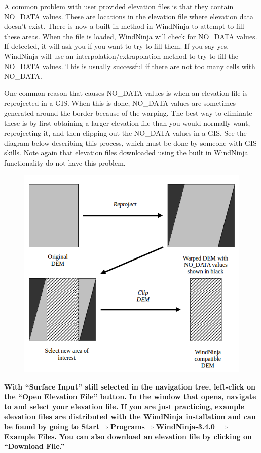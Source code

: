 \documentclass[12pt]{article}
\newcommand\vn{3.4.0}
\begin{document}
A common problem with user provided elevation files is that they contain NO\_DATA values.  These are locations in the elevation file where elevation data doesn’t exist.  There is now a built-in method in WindNinja to attempt to fill these areas.  When the file is loaded, WindNinja will check for NO\_DATA values.  If detected, it will ask you if you want to try to fill them.  If you say yes, WindNinja will use an interpolation/extrapolation method to try to fill the NO\_DATA values.  This is usually successful if there are not too many cells with NO\_DATA.

One common reason that causes NO\_DATA values is when an elevation file is reprojected in a GIS.  When this is done, NO\_DATA values are sometimes generated around the border because of the warping.  The best way to eliminate these is by first obtaining a larger elevation file than you would normally want, reprojecting it, and then clipping out the NO\_DATA values in a GIS.  See the diagram below describing this process, which must be done by someone with GIS skills.  Note again that elevation files downloaded using the built in WindNinja functionality do not have this problem.

\begin{figure}[H]
	\centering
	\label{}
	\includegraphics[scale=1.0]{dem_crop.png}
\end{figure}

\textbf{\color{red} With “Surface Input” still selected in the navigation tree, left-click on the “Open Elevation File” button.  In the window that opens, navigate to and select your elevation file.  If you are just practicing, example elevation files are distributed with the WindNinja installation and can be found by going to Start$\Rightarrow$Programs$\Rightarrow$WindNinja-\vn\ $\Rightarrow$Example Files.  You can also download an elevation file by clicking on “Download File.”}
\end{document}
